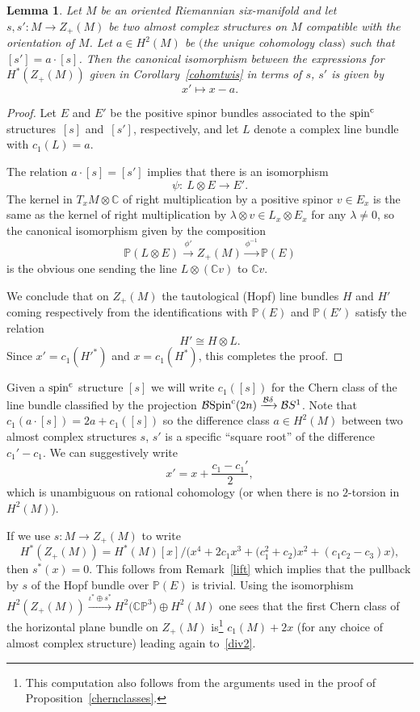 \documentclass[pdftex]{sigma}%
\newcommand{\CP}{\mathbb{CP}}
\newcommand{\C}{\mathbb{C}}
\numberwithin{equation}{section}
\newtheorem{Lemma}[Theorem]{Lemma}
\begin{document}
\begin{Lemma}
Let $M$ be an oriented Riemannian six-manifold and let $s,s'\colon M \to Z_+(M)$ be
two almost complex structures on $M$ compatible with the orientation of $M$.
Let $a \in H^2(M)$ be $($the unique cohomology class$)$ such that $[s']=a\cdot [s]$.
Then the canonical isomorphism between the expressions for $H^*(Z_+(M))$ given in Corollary~{\rm \ref{cohomtwis}} in terms of $s$, $s'$ is given by
\[
x' \mapsto x - a.
\]
\end{Lemma}
\begin{proof}
Let $E$ and $E'$ be the positive spinor bundles associated to the ${\rm spin}^{\rm c}$ structures~$[s]$ and~$[s']$, respectively, and let $L$ denote a complex line bundle with $c_1(L)=a$.

The relation $a \cdot [s]=[s']$ implies that there is an isomorphism
\[\psi \colon \ L \otimes E \to E'.\]
The kernel in $T_x M \otimes \C$ of right multiplication by a positive spinor
$v \in E_x$ is the same as the kernel of right multiplication by $\lambda \otimes v \in
L_x \otimes E_x$ for any $\lambda \neq 0$, so the canonical isomorphism given by the
composition
\[
\mathbb{P}(L\otimes E) \xrightarrow{\phi'} Z_+(M) \xrightarrow{\phi^{-1}} \mathbb{P}(E)
\]
is the obvious one sending the line $L \otimes (\C v)$ to $\C v$.

We conclude that on $Z_+(M)$ the tautological (Hopf) line bundles $H$ and $H'$ coming
respectively from the identifications with $\mathbb{P}(E)$ and $\mathbb{P}(E')$ satisfy
the relation
\[
H' \cong H \otimes L.
\]
Since $x'=c_1(H'^*)$ and $x=c_1(H^*)$, this completes the proof.
\end{proof}

Given a ${\rm spin}^{\rm c}$ structure $[s]$ we will write $c_1([s])$ for the Chern class of
the line bundle classified by the projection ${\mathcal B}{\rm Spin}^{\rm c}(2n) \xrightarrow{{\mathcal B}\delta} {\mathcal B}S ^1$.
Note that $c_1( a\cdot [s]) = 2a + c_1([s])$ so the difference class $a \in H^2(M)$
between two almost complex structures $s$, $s'$ is a specific ``square root'' of the
difference $c_1'-c_1$. We can suggestively write
\begin{equation}
\label{div2}
x' = x + \frac{c_1-c_1'}{2},
\end{equation}
which is unambiguous on rational cohomology (or when there is no $2$-torsion in $H^2(M)$).

\begin{Remark}
If we use $s\colon M \to Z_+(M)$ to write
\[
H^*(Z_+(M)) = H^*(M)[x]/\big(x^4 + 2c_1 x^3 + \big(c_1^2+c_2\big)x^2 + (c_1c_2-c_3) x\big),
\]
then $s^*(x)=0$. This follows from Remark~\ref{lift} which implies that
the pullback by $s$ of the Hopf bundle over $\mathbb P(E)$ is trivial. Using the isomorphism $H^2(Z_+(M)) \xrightarrow{\iota^*\oplus s^*} H^2\big(\CP^3\big) \oplus H^2(M)$ one sees that the first Chern class of the horizontal
plane bundle on $Z_+(M)$ is\footnote{This computation also follows from the arguments used in the proof of Proposition~\ref{chernclasses}.} $c_1(M)+2x$ (for any choice of almost complex structure) leading again to~\eqref{div2}.
\end{Remark}
\end{document}
